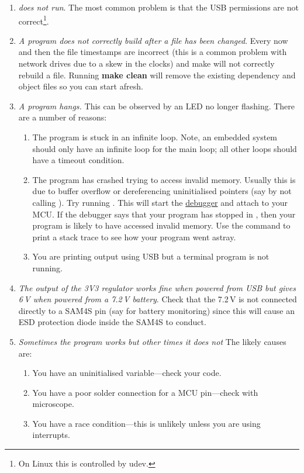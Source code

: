 \begin{enumerate}
\item
  \emph{ does not run}. The most common problem is
  that the USB permissions are not correct\footnote{On Linux this is
    controlled by udev.}.
  
\item
  \emph{A program does not correctly build after a file has been
    changed}. Every now and then the file timestamps are incorrect
  (this is a common problem with network drives due to a skew in the
  clocks) and make will not correctly rebuild a file. Running
  \textbf{make clean} will remove the existing dependency and object
  files so you can start afresh.
  
\item
  \emph{A program hangs.} This can be observed by an LED no longer
  flashing. There are a number of reasons:

  \begin{enumerate}
  \item
    The program is stuck in an infinite loop. Note, an embedded system
    should only have an infinite loop for the main loop; all other loops
    should have a timeout condition.
  \item
    The program has crashed trying to access invalid memory. Usually
    this is due to buffer overflow or dereferencing uninitialised
    pointers (say by not calling ). Try running
    .  This will start the
    \protect\hyperref[debugging]{debugger} and attach to your MCU. If
    the debugger says that your program has stopped in
    , then your program is likely to have
    accessed invalid memory. Use the  command to print a
    stack trace to see how your program went astray.
    
  \item You are printing output using USB but a terminal program is
    not running.
  \end{enumerate}
  
\item
  \emph{The output of the 3V3 regulator works fine when powered from
    USB but gives 6\,V when powered from a 7.2\,V battery}. Check that
  the 7.2\,V is not connected directly to a SAM4S pin (say for battery
  monitoring) since this will cause an ESD protection diode inside the
  SAM4S to conduct.

\item \emph{Sometimes the program works but other times it does not}
  The likely causes are:
  \begin{enumerate}
  \item You have an uninitialised variable---check your code.

  \item You have a poor solder connection for a MCU pin---check with
    microscope.

  \item You have a race condition---this is unlikely unless you are
    using interrupts.
  \end{enumerate}

\end{enumerate}

